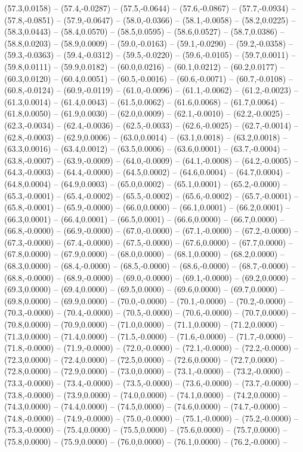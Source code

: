 \documentclass{SVnote}
\begin{document}
(57.3,0.0158) -- (57.4,-0.0287) -- (57.5,-0.0644) -- (57.6,-0.0867) -- (57.7,-0.0934) -- (57.8,-0.0851) -- (57.9,-0.0647) -- (58.0,-0.0366) -- (58.1,-0.0058) -- (58.2,0.0225) -- (58.3,0.0443) -- (58.4,0.0570) -- (58.5,0.0595) -- (58.6,0.0527) -- (58.7,0.0386) -- (58.8,0.0203) -- (58.9,0.0009) -- (59.0,-0.0163) -- (59.1,-0.0290) -- (59.2,-0.0358) -- (59.3,-0.0363) -- (59.4,-0.0312) -- (59.5,-0.0220) -- (59.6,-0.0105) -- (59.7,0.0011) -- (59.8,0.0111) -- (59.9,0.0182) -- (60.0,0.0216) -- (60.1,0.0212) -- (60.2,0.0177) -- (60.3,0.0120) -- (60.4,0.0051) -- (60.5,-0.0016) -- (60.6,-0.0071) -- (60.7,-0.0108) -- (60.8,-0.0124) -- (60.9,-0.0119) -- (61.0,-0.0096) -- (61.1,-0.0062) -- (61.2,-0.0023) -- (61.3,0.0014) -- (61.4,0.0043) -- (61.5,0.0062) -- (61.6,0.0068) -- (61.7,0.0064) -- (61.8,0.0050) -- (61.9,0.0030) -- (62.0,0.0009) -- (62.1,-0.0010) -- (62.2,-0.0025) -- (62.3,-0.0034) -- (62.4,-0.0036) -- (62.5,-0.0033) -- (62.6,-0.0025) -- (62.7,-0.0014) -- (62.8,-0.0003) -- (62.9,0.0006) -- (63.0,0.0014) -- (63.1,0.0018) -- (63.2,0.0018) -- (63.3,0.0016) -- (63.4,0.0012) -- (63.5,0.0006) -- (63.6,0.0001) -- (63.7,-0.0004) -- (63.8,-0.0007) -- (63.9,-0.0009) -- (64.0,-0.0009) -- (64.1,-0.0008) -- (64.2,-0.0005) -- (64.3,-0.0003) -- (64.4,-0.0000) -- (64.5,0.0002) -- (64.6,0.0004) -- (64.7,0.0004) -- (64.8,0.0004) -- (64.9,0.0003) -- (65.0,0.0002) -- (65.1,0.0001) -- (65.2,-0.0000) -- (65.3,-0.0001) -- (65.4,-0.0002) -- (65.5,-0.0002) -- (65.6,-0.0002) -- (65.7,-0.0001) -- (65.8,-0.0001) -- (65.9,-0.0000) -- (66.0,0.0000) -- (66.1,0.0001) -- (66.2,0.0001) -- (66.3,0.0001) -- (66.4,0.0001) -- (66.5,0.0001) -- (66.6,0.0000) -- (66.7,0.0000) -- (66.8,-0.0000) -- (66.9,-0.0000) -- (67.0,-0.0000) -- (67.1,-0.0000) -- (67.2,-0.0000) -- (67.3,-0.0000) -- (67.4,-0.0000) -- (67.5,-0.0000) -- (67.6,0.0000) -- (67.7,0.0000) -- (67.8,0.0000) -- (67.9,0.0000) -- (68.0,0.0000) -- (68.1,0.0000) -- (68.2,0.0000) -- (68.3,0.0000) -- (68.4,-0.0000) -- (68.5,-0.0000) -- (68.6,-0.0000) -- (68.7,-0.0000) -- (68.8,-0.0000) -- (68.9,-0.0000) -- (69.0,-0.0000) -- (69.1,-0.0000) -- (69.2,0.0000) -- (69.3,0.0000) -- (69.4,0.0000) -- (69.5,0.0000) -- (69.6,0.0000) -- (69.7,0.0000) -- (69.8,0.0000) -- (69.9,0.0000) -- (70.0,-0.0000) -- (70.1,-0.0000) -- (70.2,-0.0000) -- (70.3,-0.0000) -- (70.4,-0.0000) -- (70.5,-0.0000) -- (70.6,-0.0000) -- (70.7,0.0000) -- (70.8,0.0000) -- (70.9,0.0000) -- (71.0,0.0000) -- (71.1,0.0000) -- (71.2,0.0000) -- (71.3,0.0000) -- (71.4,0.0000) -- (71.5,-0.0000) -- (71.6,-0.0000) -- (71.7,-0.0000) -- (71.8,-0.0000) -- (71.9,-0.0000) -- (72.0,-0.0000) -- (72.1,-0.0000) -- (72.2,-0.0000) -- (72.3,0.0000) -- (72.4,0.0000) -- (72.5,0.0000) -- (72.6,0.0000) -- (72.7,0.0000) -- (72.8,0.0000) -- (72.9,0.0000) -- (73.0,0.0000) -- (73.1,-0.0000) -- (73.2,-0.0000) -- (73.3,-0.0000) -- (73.4,-0.0000) -- (73.5,-0.0000) -- (73.6,-0.0000) -- (73.7,-0.0000) -- (73.8,-0.0000) -- (73.9,0.0000) -- (74.0,0.0000) -- (74.1,0.0000) -- (74.2,0.0000) -- (74.3,0.0000) -- (74.4,0.0000) -- (74.5,0.0000) -- (74.6,0.0000) -- (74.7,-0.0000) -- (74.8,-0.0000) -- (74.9,-0.0000) -- (75.0,-0.0000) -- (75.1,-0.0000) -- (75.2,-0.0000) -- (75.3,-0.0000) -- (75.4,0.0000) -- (75.5,0.0000) -- (75.6,0.0000) -- (75.7,0.0000) -- (75.8,0.0000) -- (75.9,0.0000) -- (76.0,0.0000) -- (76.1,0.0000) -- (76.2,-0.0000) -- 
\end{document}
